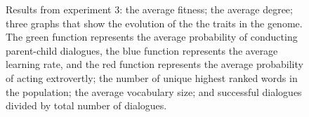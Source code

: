 \begin{figure}[b]\setcounter{subfigure}{0}
    \centering
    \hfill
    \caption[Graphs of the results from experiment 3 as a function of number of generations.]{Results from experiment 3:  the average fitness;  the average degree;  three graphs that show the evolution of the the traits in the genome. The green function represents the average probability of conducting parent-child dialogues, the blue function represents the average learning rate, and the red function represents the average probability of acting extrovertly;  the number of unique highest ranked words in the population;  the average vocabulary size; and  successful dialogues divided by total number of dialogues.}
    \label{fig:exp3.0}
\end{figure}
%
